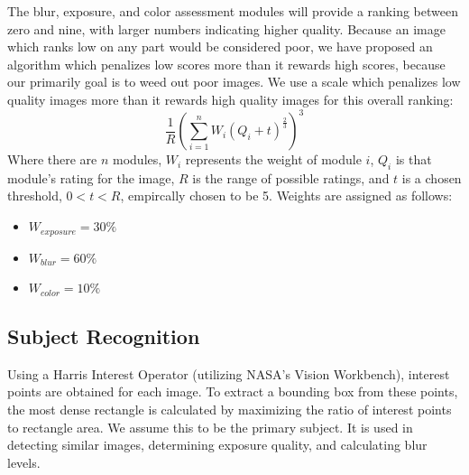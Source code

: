 \documentclass{article}
\begin{document}
The blur, exposure, and color assessment modules will provide a ranking between zero and nine, with larger numbers indicating higher quality. Because an image which ranks low on any part would be considered poor, we have proposed an algorithm which penalizes low scores more than it rewards high scores, because our primarily goal is to weed out poor images. We use a scale which penalizes low quality images more than it rewards high quality images for this overall ranking:
\[
\frac{1}{R}\left(\displaystyle\sum\limits_{i=1}^nW_i\left({Q_i+t}\right)^\frac{2}{3}\right)^3
\]
Where there are \(n\) modules, \(W_i\) represents the weight of module \(i\), \(Q_i\) is that module's rating for the image, \(R\) is the range of possible ratings, and \(t\) is a chosen threshold, \(0<t<R\), empircally chosen to be 5. Weights are assigned as follows:
\begin{itemize}
\item \(W_{exposure}=30\%\)
\item \(W_{blur}=60\%\)
\item \(W_{color}=10\%\)
\end{itemize}

\subsection{Subject Recognition}\label{ContentRecognition}
Using a Harris Interest Operator (utilizing NASA's Vision Workbench\cite{vision-workbench}), interest points are obtained for each image. To extract a bounding box from these points, the most dense rectangle is calculated by maximizing the ratio of interest points to rectangle area. We assume this to be the primary subject. It is used in detecting similar images, determining exposure quality, and calculating blur levels. 
\end{document}
